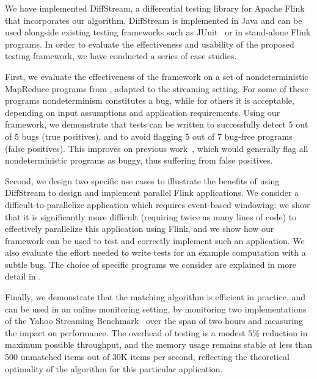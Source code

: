 We have implemented DiffStream{}, a differential testing library for Apache Flink that incorporates our algorithm.
DiffStream{} is implemented in Java and can be used alongside existing
testing frameworks such as
JUnit~\cite{JUnitWeb} or in stand-alone Flink programs.
In order to evaluate the effectiveness and usability of the proposed testing framework, we have conducted a series of case studies.

First, we evaluate the effectiveness of the framework on a
set of nondeterministic MapReduce programs from \cite{xiao2014nondeterminism}, adapted to the streaming setting.
For some of these programs nondeterminism constitutes a bug, while for others it is acceptable, depending on input assumptions and application requirements.
Using our framework, we demonstrate that tests can be written to successfully detect 5 out of 5 bugs (true positives), and to avoid flagging 5 out of 7 bug-free programs (false positives).
This improves on previous work~\cite{xu2013testing}, which would generally flag all nondeterministic programs as buggy, thus suffering from false positives.

Second, we design two specific use cases to illustrate the benefits of
using DiffStream to design and implement parallel Flink applications. We
consider a difficult-to-parallelize application which requires
event-based windowing: we show that it is significantly more difficult
(requiring twice as many lines of code) to effectively parallelize
this application using Flink, and we show how our framework can be
used to test and correctly implement such an application. We also
evaluate the effort needed to write tests for an example computation
with a subtle bug. The choice of specific programs we consider are explained in
more detail in .

Finally, we demonstrate that the matching algorithm is efficient in
practice, and can be used in an online monitoring setting, by
monitoring two implementations of the Yahoo Streaming
Benchmark~\cite{yahoostreaming2016} over the span of two hours and measuring the impact on performance.
The overhead of testing is a modest $5\%$ reduction in maximum possible throughput, and the memory usage remains stable at less than 500 unmatched items out of 30K items per second, reflecting the theoretical optimality of the algorithm for this particular application.

